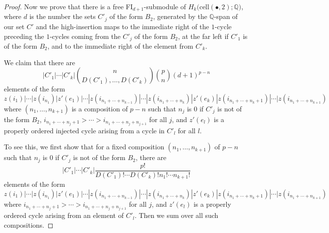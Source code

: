 \documentclass[12py]{amsart}%
\theoremstyle{definition}\newtheorem{definition}[thm]{Definition}
\theoremstyle{definition}
\newcommand{\Q}{\ensuremath{\mathbb{Q}}}
\begin{document}
\begin{proof}
Now we prove that there is a free FI$_{d+1}$-submodule of $H_{k}\big(\text{cell}(\bullet, 2);\Q\big)$, where $d$ is the number the sets $C'_{j}$ of the form $B_{2}$, generated by the $\Q$-span of our set $C'$ and the high-insertion maps to the immediate right of the $1$-cycle preceding the $1$-cycles coming from the $C'_{j}$ of the form $B_{2}$, at the far left if $C'_{1}$ is of the form $B_{2}$, and to the immediate right of the element from $C'_{k}$. 

We claim that there are 
\[
|C'_{1}|\cdots|C'_{k}|\binom{n}{D(C'_{1}),\dots, D(C'_{k})}\binom{p}{n}(d+1)^{p-n}
\]
elements of the form 
\[
z(i_{1})|\cdots|z(i_{n_{1}})|z'(e_{1})|\cdots|z(i_{n_{1}+\cdots+n_{k-1}})|\cdots|z(i_{n_{1}+\cdots+n_{k}})|z'(e_{k})|z(i_{n_{1}+\cdots+n_{k}+1})|\cdots|z(i_{n_{1}+\cdots+n_{k+1}})
\]
where $(n_{1},\dots, n_{k+1})$ is a composition of $p-n$ such that $n_{j}$ is $0$ if $C'_{j}$ is not of the form $B_{2}$, $i_{n_{1}+\cdots+n_{j}+1}>\cdots>i_{n_{1}+\cdots+n_{j}+n_{j+1}}$ for all $j$, and $z'(e_{l})$ is a properly ordered injected cycle arising from a cycle in $C'_{l}$ for all $l$.

To see this, we first show that for a fixed composition $(n_{1},\dots, n_{k+1})$ of $p-n$ such that $n_{j}$ is $0$ if $C'_{j}$ is not of the form $B_{2}$, there are 
\[
|C'_{1}|\cdots|C'_{k}|\frac{p!}{D(C'_{1})!\cdots D(C'_{k})!n_{1}!\cdots n_{k+1}!}
\]
elements of the form
\[
z(i_{1})|\cdots|z(i_{n_{1}})|z'(e_{1})|\cdots|z(i_{n_{1}+\cdots+n_{k-1}})|\cdots|z(i_{n_{1}+\cdots+n_{k}})|z'(e_{k})|z(i_{n_{1}+\cdots+n_{k}+1})|\cdots|z(i_{n_{1}+\cdots+n_{k+1}})
\]
where $i_{n_{1}+\cdots+n_{j}+1}>\cdots>i_{n_{1}+\cdots+n_{j}+n_{j+1}}$ for all $j$, and $z'(e_{l})$ is a properly ordered cycle arising from an element of $C'_{l}$. Then we sum over all such compositions.


\end{proof}
\end{document}
